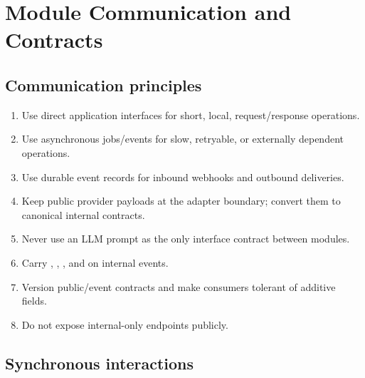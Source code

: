 \chapter{Module Communication and Contracts}

\section{Communication principles}

\begin{enumerate}
\item Use direct application interfaces for short, local, request/response operations.
\item Use asynchronous jobs/events for slow, retryable, or externally dependent operations.
\item Use durable event records for inbound webhooks and outbound deliveries.
\item Keep public provider payloads at the adapter boundary; convert them to canonical internal contracts.
\item Never use an LLM prompt as the only interface contract between modules.
\item Carry , , , and  on internal events.
\item Version public/event contracts and make consumers tolerant of additive fields.
\item Do not expose internal-only endpoints publicly.
\end{enumerate}
\section{Synchronous interactions}

